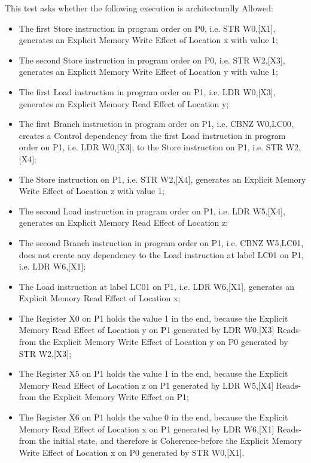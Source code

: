 This test asks whether the following execution is architecturally Allowed:

\begin{itemize}
  \item The first Store instruction in program order on P0, i.e. STR W0,[X1], generates an Explicit Memory Write Effect of Location x with value 1;
  \item The second Store instruction in program order on P0, i.e. STR W2,[X3], generates an Explicit Memory Write Effect of Location y with value 1;
  \item The first Load instruction in program order on P1, i.e. LDR W0,[X3], generates an Explicit Memory Read Effect of Location y;
  \item The first Branch instruction in program order on P1, i.e. CBNZ W0,LC00, creates a Control dependency from the first Load instruction in program order on P1, i.e. LDR W0,[X3], to the Store instruction on P1, i.e. STR W2,[X4];
  \item The Store instruction on P1, i.e. STR W2,[X4], generates an Explicit Memory Write Effect of Location z with value 1;
  \item The second Load instruction in program order on P1, i.e. LDR W5,[X4], generates an Explicit Memory Read Effect of Location z;
  \item The second Branch instruction in program order on P1, i.e. CBNZ W5,LC01, does not create any dependency to the Load instruction at label LC01 on P1, i.e. LDR W6,[X1];
  \item The Load instruction at label LC01 on P1, i.e. LDR W6,[X1], generates an Explicit Memory Read Effect of Location x;
  \item The Register X0 on P1 holds the value 1 in the end, because the Explicit Memory Read Effect of Location y on P1 generated by LDR W0,[X3] Reads-from the Explicit Memory Write Effect of Location y on P0 generated by STR W2,[X3];
  \item The Register X5 on P1 holds the value 1 in the end, because the Explicit Memory Read Effect of Location z on P1 generated by LDR W5,[X4] Reads-from the Explicit Memory Write Effect on P1;
  \item The Register X6 on P1 holds the value 0 in the end, because the Explicit Memory Read Effect of Location x on P1 generated by LDR W6,[X1] Reads-from the initial state, and therefore is Coherence-before the Explicit Memory Write Effect of Location x on P0 generated by STR W0,[X1].
\end{itemize}
